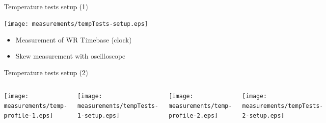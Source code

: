 \documentclass[compress,red]{beamer}
\begin{document}
\subsection{}
\begin{frame}{Temperature tests setup (1)}

	\begin{center}
	\texttt{[image: measurements/tempTests-setup.eps]}

	\begin{itemize}
		\item Measurement of WR Timebase (clock)
		\item Skew measurement with oscilloscope
	\end{itemize}	

	\end{center}


\end{frame}
\begin{frame}{Temperature tests setup (2)}

\vspace{-1cm}
  \begin{columns}[c]
		\hspace{-1cm}
		\begin{center}
		\texttt{[image: measurements/temp-profile-1.eps]}
		\end{center}
\vspace{-0.5cm}
		\begin{center}
		\texttt{[image: measurements/tempTests-1-setup.eps]}
		\end{center}
		\hspace{-1cm}
		\begin{center}
		\texttt{[image: measurements/temp-profile-2.eps]}
		\end{center}
		\vspace{-0.5cm}
		\begin{center}
		\texttt{[image: measurements/tempTests-2-setup.eps]}
		\end{center}
  \end{columns}

\end{frame}
\end{document}
